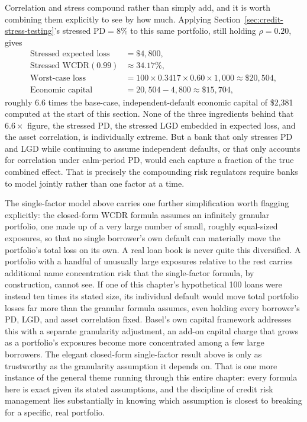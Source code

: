 \documentclass[../ai_in_finance]{subfiles}
\begin{document}
Correlation and stress compound rather than simply add, and it is worth combining them explicitly to see by how much. Applying Section~\ref{sec:credit-stress-testing}'s stressed $\text{PD}=8\%$ to this same portfolio, still holding $\rho=0.20$, gives
\begin{align*}
\text{Stressed expected loss} &= \$4{,}800, \\
\text{Stressed WCDR}(0.99) &\approx 34.17\%, \\
\text{Worst-case loss} &= 100\times0.3417\times0.60\times1{,}000 \approx \$20{,}504, \\
\text{Economic capital} &= 20{,}504-4{,}800 \approx \$15{,}704,
\end{align*}
roughly $6.6$ times the base-case, independent-default economic capital of \$2,381 computed at the start of this section. None of the three ingredients behind that $6.6\times$ figure, the stressed PD, the stressed LGD embedded in expected loss, and the asset correlation, is individually extreme. But a bank that only stresses PD and LGD while continuing to assume independent defaults, or that only accounts for correlation under calm-period PD, would each capture a fraction of the true combined effect. That is precisely the compounding risk regulators require banks to model jointly rather than one factor at a time.

The single-factor model above carries one further simplification worth flagging explicitly: the closed-form WCDR formula assumes an infinitely granular portfolio, one made up of a very large number of small, roughly equal-sized exposures, so that no single borrower's own default can materially move the portfolio's total loss on its own. A real loan book is never quite this diversified. A portfolio with a handful of unusually large exposures relative to the rest carries additional name concentration risk that the single-factor formula, by construction, cannot see. If one of this chapter's hypothetical 100 loans were instead ten times its stated size, its individual default would move total portfolio losses far more than the granular formula assumes, even holding every borrower's PD, LGD, and asset correlation fixed.
Basel's own capital framework addresses this with a separate granularity adjustment, an add-on capital charge that grows as a portfolio's exposures become more concentrated among a few large borrowers. The elegant closed-form single-factor result above is only as trustworthy as the granularity assumption it depends on. That is one more instance of the general theme running through this entire chapter: every formula here is exact given its stated assumptions, and the discipline of credit risk management lies substantially in knowing which assumption is closest to breaking for a specific, real portfolio.
\end{document}
